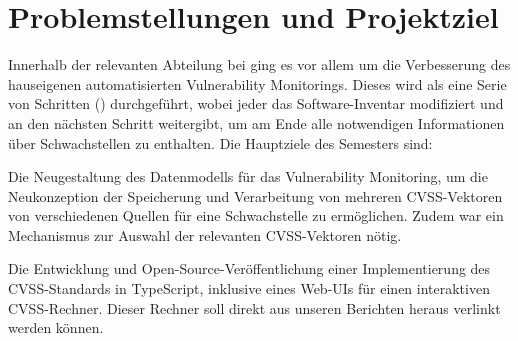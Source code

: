 \section{Problemstellungen und Projektziel} \label{sec:projektbericht-projektziel}

Innerhalb der relevanten Abteilung bei {\metaeffekt} ging es vor allem um die Verbesserung des hauseigenen automatisierten Vulnerability Monitorings.
Dieses wird als eine Serie von Schritten () durchgeführt, wobei jeder das Software-Inventar modifiziert und an den nächsten Schritt weitergibt, um am Ende alle notwendigen Informationen über Schwachstellen zu enthalten.
Die Hauptziele des Semesters sind:

\begin{smitemize}
    \item Die Neugestaltung des Datenmodells für das Vulnerability Monitoring, um die Neukonzeption der Speicherung und Verarbeitung von mehreren CVSS-Vektoren von verschiedenen Quellen für eine Schwachstelle zu ermöglichen.
    Zudem war ein Mechanismus zur Auswahl der relevanten CVSS-Vektoren nötig.
    \item Die Entwicklung und Open-Source-Veröffentlichung einer Implementierung des CVSS-Standards in TypeScript, inklusive eines Web-UIs für einen interaktiven CVSS-Rechner.
    Dieser Rechner soll direkt aus unseren Berichten heraus verlinkt werden können.
\end{smitemize}
